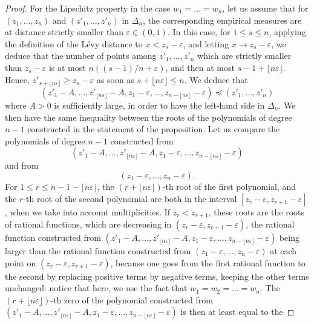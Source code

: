 \documentclass[11pt]{amsart}
\begin{document}
\begin{proof}
For the Lipschitz property in the case 
$w_1 = \dots = w_n$, let us assume that 
for $(z_1, \dots, z_n)$ and 
$(z'_1, \dots, z'_n)$ in $\Delta_n$, the corresponding empirical measures are at distance strictly smaller than $\varepsilon \in (0,1)$. 
In this case, for $1 \leq s \leq n$, applying the definition
of the L\'evy distance to $x < z_s - \varepsilon$,  and letting $x \rightarrow z_s - \varepsilon$, we deduce that the number of points 
among $z'_1, \dots, z'_n$ which are strictly smaller than 
$z_s - \varepsilon$ is at most $n ( (s-1)/n + \varepsilon)$, and then at most $s - 1 + \lfloor n \varepsilon \rfloor $. Hence, 
$z'_{s + \lfloor n \varepsilon \rfloor}  \geq z_s - \varepsilon$ as soon 
as $s + \lfloor n \varepsilon \rfloor \leq n$. 
We deduce that
$$(z'_1 - A, \dots, z'_{ \lfloor n \varepsilon \rfloor} - A, z_1 - \varepsilon, \dots, z_{n -\lfloor n \varepsilon \rfloor} - \varepsilon)
\preccurlyeq (z'_1, \dots, z'_n) $$
where $A > 0$ is sufficiently large, in order to have the left-hand side in $\Delta_n$. 
We then have the same inequality 
between the roots of the polynomials of degree $n-1$
constructed in the statement of the proposition. 
Let us compare the polynomials of degree $n-1$
constructed from 
$$(z'_1 - A, \dots, z'_{ \lfloor n \varepsilon \rfloor} - A, z_1 - \varepsilon, \dots, z_{n -\lfloor n \varepsilon \rfloor} - \varepsilon)$$ and from 
$$ (z_1 - \varepsilon, \dots, z_n - \varepsilon).$$
For $1 \leq r \leq n - 1- \lfloor n \varepsilon \rfloor$, 
the $(r + \lfloor n \varepsilon \rfloor)$-th 
root of the first polynomial, and the $r$-th root of the second polynomial are both in the interval $[z_r - \varepsilon, z_{r+1} - \varepsilon]$, when we take into account multiplicities. If $z_r < z_{r+1}$, these roots are the roots of rational functions, which are decreasing in $(z_r- \varepsilon, z_{r+1}- \varepsilon)$, 
the rational function constructed from 
$(z'_1 - A, \dots, z'_{ \lfloor n \varepsilon \rfloor} - A, z_1 - \varepsilon, \dots, z_{n -\lfloor n \varepsilon \rfloor} - \varepsilon)$ being larger than the rational function constructed from $(z_1 - \varepsilon, \dots, z_n - \varepsilon)$ at each point on $(z_r- \varepsilon, z_{r+1}- \varepsilon)$, because one goes from the first rational function to the second by replacing positive terms by negative terms, keeping the other terms unchanged: notice that here, we use the fact that $w_1 = w_2 = \dots = w_n$.  The $(r + \lfloor n \varepsilon \rfloor)$-th zero of the polynomial constructed 
from $(z'_1 - A, \dots, z'_{ \lfloor n \varepsilon \rfloor} - A, z_1 - \varepsilon, \dots, z_{n -\lfloor n \varepsilon \rfloor} - \varepsilon)$ is then at least equal to the 

\end{proof}
\end{document}
